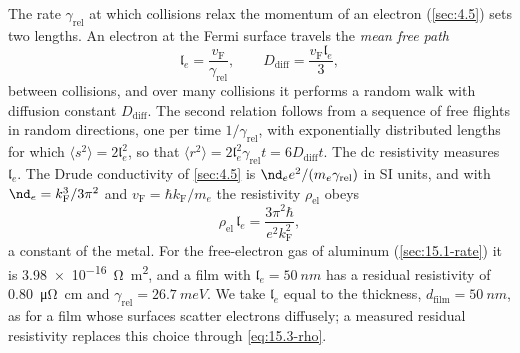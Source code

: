 The rate $\gamma_{\mathrm{rel}}$ at which collisions relax the momentum of an electron (\cref{sec:4.5}) sets two lengths. An electron at the Fermi surface travels the \emph{mean free path}
\begin{equation}
  \mathfrak{l}_e = \frac{v_{\mathrm{F}}}{\gamma_{\mathrm{rel}}}, \qquad D_{\mathrm{diff}} = \frac{v_{\mathrm{F}}\mathfrak{l}_e}{3} ,
  \label{eq:15.3-le}
\end{equation}
between collisions, and over many collisions it performs a random walk with diffusion constant $D_{\mathrm{diff}}$. The second relation follows from a sequence of free flights in random directions, one per time $1/\gamma_{\mathrm{rel}}$, with exponentially distributed lengths for which $\langle s^2\rangle = 2\mathfrak{l}_e^2$, so that $\langle r^2\rangle = 2\mathfrak{l}_e^2\gamma_{\mathrm{rel}}t = 6D_{\mathrm{diff}}t$. The dc resistivity measures $\mathfrak{l}_e$. The Drude conductivity of \cref{sec:4.5} is $\nd_ee^2/(m_e\gamma_{\mathrm{rel}})$ in SI units, and with $\nd_e = k_{\mathrm{F}}^3/3\pi^2$ and $v_{\mathrm{F}} = \hbar k_{\mathrm{F}}/m_e$ the resistivity $\rho_{\mathrm{el}}$ obeys
\begin{equation}
  \rho_{\mathrm{el}}\,\mathfrak{l}_e = \frac{3\pi^2\hbar}{e^2k_{\mathrm{F}}^2} ,
  \label{eq:15.3-rho}
\end{equation}
a constant of the metal. For the free-electron gas of aluminum (\cref{sec:15.1-rate}) it is \SI{3.98e-16}{\ohm.m^2}, and a film with $\mathfrak{l}_e = \SI{50}{nm}$ has a residual resistivity of \SI{0.80}{\micro\ohm.cm} and $\gamma_{\mathrm{rel}} = \SI{26.7}{meV}$. We take $\mathfrak{l}_e$ equal to the thickness, $d_{\mathrm{film}} = \SI{50}{nm}$, as for a film whose surfaces scatter electrons diffusely; a measured residual resistivity replaces this choice through \cref{eq:15.3-rho}.


